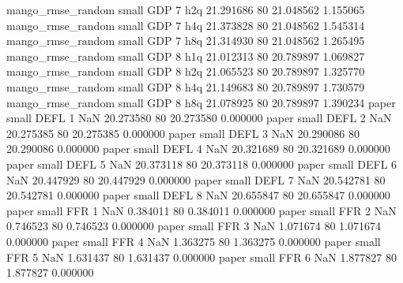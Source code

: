 mango_rmse_random      small      GDP                 7                  h2q 21.291686 80      21.048562           1.155065
mango_rmse_random      small      GDP                 7                  h4q 21.373828 80      21.048562           1.545314
mango_rmse_random      small      GDP                 7                  h8q 21.314930 80      21.048562           1.265495
mango_rmse_random      small      GDP                 8                  h1q 21.012313 80      20.789897           1.069827
mango_rmse_random      small      GDP                 8                  h2q 21.065523 80      20.789897           1.325770
mango_rmse_random      small      GDP                 8                  h4q 21.149683 80      20.789897           1.730579
mango_rmse_random      small      GDP                 8                  h8q 21.078925 80      20.789897           1.390234
            paper      small     DEFL                 1                  NaN 20.273580 80      20.273580           0.000000
            paper      small     DEFL                 2                  NaN 20.275385 80      20.275385           0.000000
            paper      small     DEFL                 3                  NaN 20.290086 80      20.290086           0.000000
            paper      small     DEFL                 4                  NaN 20.321689 80      20.321689           0.000000
            paper      small     DEFL                 5                  NaN 20.373118 80      20.373118           0.000000
            paper      small     DEFL                 6                  NaN 20.447929 80      20.447929           0.000000
            paper      small     DEFL                 7                  NaN 20.542781 80      20.542781           0.000000
            paper      small     DEFL                 8                  NaN 20.655847 80      20.655847           0.000000
            paper      small      FFR                 1                  NaN  0.384011 80       0.384011           0.000000
            paper      small      FFR                 2                  NaN  0.746523 80       0.746523           0.000000
            paper      small      FFR                 3                  NaN  1.071674 80       1.071674           0.000000
            paper      small      FFR                 4                  NaN  1.363275 80       1.363275           0.000000
            paper      small      FFR                 5                  NaN  1.631437 80       1.631437           0.000000
            paper      small      FFR                 6                  NaN  1.877827 80       1.877827           0.000000
